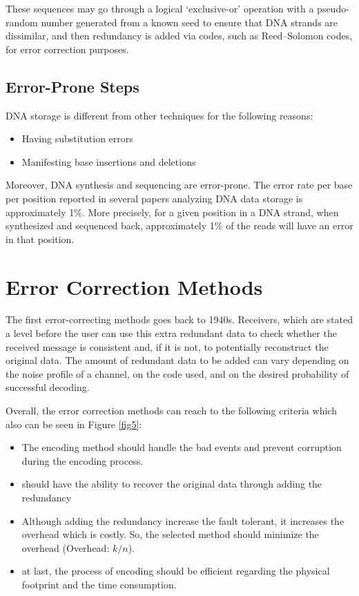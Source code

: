 \documentclass[10pt,twocolumn,twoside]{gsajnl}
\theoremstyle{definition}
\begin{document}
These sequences may go through a logical ‘exclusive-or’ operation with a pseudo-random number generated from a known seed to ensure that DNA strands are dissimilar, and then redundancy is added via codes, such as Reed–Solomon codes, for error correction purposes.

\subsection{Error-Prone Steps}
DNA storage is different from other techniques for the following reasons:
\begin{itemize}
    \item Having substitution errors
    \item Manifesting base insertions and deletions
\end{itemize}

Moreover, DNA synthesis and sequencing are error-prone. The error rate per base per position reported in several papers analyzing DNA data storage is approximately 1\%. More precisely, for a given position in a DNA strand, when synthesized and sequenced back, approximately 1\% of the reads will have an error in that position.
\section{Error Correction Methods}
\label{sec: Error Correction Methods}
The first error-correcting methods goes back to 1940s. Receivers, which are stated a level before the user can use this extra redundant data to check whether the received message is consistent and, if it is not, to potentially reconstruct the original data. The amount of redundant data to be added can vary depending on the noise profile of a channel, on the code used, and on the desired probability of successful decoding.

Overall, the error correction methods can reach to the following criteria which also can be seen in Figure \ref{fig5}:
\begin{itemize}
    \item The encoding method should handle the bad events and prevent corruption during the encoding process.
    \item should have the ability to recover the original data through adding the redundancy
    \item Although adding the redundancy increase the fault tolerant, it increases the overhead which is costly. So, the selected method should minimize the overhead (Overhead: $k/n$).
    \item at last, the process of encoding should be efficient regarding the physical footprint and the time consumption.
\end{itemize}
\end{document}
